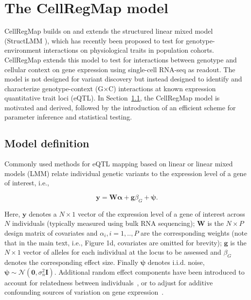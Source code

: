\section{The CellRegMap model} 

CellRegMap builds on and extends the structured linear mixed model (StructLMM \cite{moore2019linear}), which has recently been proposed to test for genotype-environment interactions on physiological traits in population cohorts. 
CellRegMap extends this model to test for interactions between genotype and cellular context on gene expression using single-cell RNA-seq as readout. 
The model is not designed for variant discovery but instead designed to identify and characterize genotype-context (G$\times$C) interactions at known expression quantitative trait loci (eQTL).
In Section~\ref{sec:model}, the CellRegMap model is motivated and derived, followed by the introduction of an efficient scheme for parameter inference and statistical testing.

\subsection{Model definition}
\label{sec:model}

Commonly used methods for eQTL mapping based on linear or linear mixed models (LMM) relate individual genetic variants to the expression level of a gene of interest, i.e.,

\begin{equation}\label{eq:LMM}
 \mathbf{y} =  \mathbf{W}\boldsymbol{\alpha} + \mathbf{g}\beta_G + \boldsymbol{\psi}. 
\end{equation}

Here, $\mathbf{y}$ denotes a $N \times 1$ vector of the expression level of a gene of interest across $N$ individuals (typically measured using bulk RNA sequencing); $\mathbf{W}$ is the $N \times P$ design matrix of covariates and $\alpha_i, i=1,..,P$ are the corresponding weights (note that in the main text, i.e., Figure 1d, covariates are omitted for brevity); $\mathbf{g}$ is the $N \times 1$ vector of alleles for each individual at the locus to be assessed and $\beta_G$ denotes the corresponding effect size.
Finally $\boldsymbol{\psi}$ denotes i.i.d. noise, $\boldsymbol{\psi} \sim \mathcal{N}(\mathbf{0}, \sigma_n^2\mathbf{I})$.
Additional random effect components have been introduced to account for relatedness between individuals~\cite{hoffman2013correcting}, or to adjust for additive confounding sources of variation on gene expression~\cite{fusi2012joint}. 

